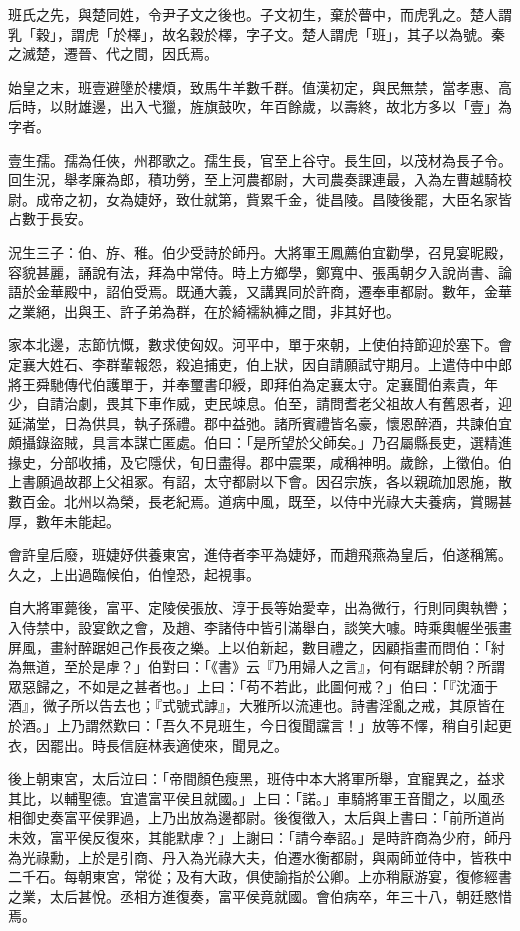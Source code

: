 
\begin{pinyinscope}
班氏之先，與楚同姓，令尹子文之後也。子文初生，棄於瞢中，而虎乳之。楚人謂乳「穀」，謂虎「於檡」，故名穀於檡，字子文。楚人謂虎「班」，其子以為號。秦之滅楚，遷晉、代之間，因氏焉。

始皇之末，班壹避墬於樓煩，致馬牛羊數千群。值漢初定，與民無禁，當孝惠、高后時，以財雄邊，出入弋獵，旌旗鼓吹，年百餘歲，以壽終，故北方多以「壹」為字者。

壹生孺。孺為任俠，州郡歌之。孺生長，官至上谷守。長生回，以茂材為長子令。回生況，舉孝廉為郎，積功勞，至上河農都尉，大司農奏課連最，入為左曹越騎校尉。成帝之初，女為婕妤，致仕就第，貲累千金，徙昌陵。昌陵後罷，大臣名家皆占數于長安。

況生三子：伯、斿、稚。伯少受詩於師丹。大將軍王鳳薦伯宜勸學，召見宴昵殿，容貌甚麗，誦說有法，拜為中常侍。時上方鄉學，鄭寬中、張禹朝夕入說尚書、論語於金華殿中，詔伯受焉。既通大義，又講異同於許商，遷奉車都尉。數年，金華之業絕，出與王、許子弟為群，在於綺襦紈褲之間，非其好也。

家本北邊，志節忼慨，數求使匈奴。河平中，單于來朝，上使伯持節迎於塞下。會定襄大姓石、李群輩報怨，殺追捕吏，伯上狀，因自請願試守期月。上遣侍中中郎將王舜馳傳代伯護單于，并奉璽書印綬，即拜伯為定襄太守。定襄聞伯素貴，年少，自請治劇，畏其下車作威，吏民竦息。伯至，請問耆老父祖故人有舊恩者，迎延滿堂，日為供具，執子孫禮。郡中益弛。諸所賓禮皆名豪，懷恩醉酒，共諫伯宜頗攝錄盜賊，具言本謀亡匿處。伯曰：「是所望於父師矣。」乃召屬縣長吏，選精進掾史，分部收捕，及它隱伏，旬日盡得。郡中震栗，咸稱神明。歲餘，上徵伯。伯上書願過故郡上父祖冢。有詔，太守都尉以下會。因召宗族，各以親疏加恩施，散數百金。北州以為榮，長老紀焉。道病中風，既至，以侍中光祿大夫養病，賞賜甚厚，數年未能起。

會許皇后廢，班婕妤供養東宮，進侍者李平為婕妤，而趙飛燕為皇后，伯遂稱篤。久之，上出過臨候伯，伯惶恐，起視事。

自大將軍薨後，富平、定陵侯張放、淳于長等始愛幸，出為微行，行則同輿執轡；入侍禁中，設宴飲之會，及趙、李諸侍中皆引滿舉白，談笑大噱。時乘輿幄坐張畫屏風，畫紂醉踞妲己作長夜之樂。上以伯新起，數目禮之，因顧指畫而問伯：「紂為無道，至於是虖？」伯對曰：「《書》云『乃用婦人之言』，何有踞肆於朝？所謂眾惡歸之，不如是之甚者也。」上曰：「苟不若此，此圖何戒？」伯曰：「『沈湎于酒』，微子所以告去也；『式號式謼』，大雅所以流連也。詩書淫亂之戒，其原皆在於酒。」上乃謂然歎曰：「吾久不見班生，今日復聞讜言！」放等不懌，稍自引起更衣，因罷出。時長信庭林表適使來，聞見之。

後上朝東宮，太后泣曰：「帝間顏色瘦黑，班侍中本大將軍所舉，宜寵異之，益求其比，以輔聖德。宜遣富平侯且就國。」上曰：「諾。」車騎將軍王音聞之，以風丞相御史奏富平侯罪過，上乃出放為邊都尉。後復徵入，太后與上書曰：「前所道尚未效，富平侯反復來，其能默虖？」上謝曰：「請今奉詔。」是時許商為少府，師丹為光祿勳，上於是引商、丹入為光祿大夫，伯遷水衡都尉，與兩師並侍中，皆秩中二千石。每朝東宮，常從；及有大政，俱使諭指於公卿。上亦稍厭游宴，復修經書之業，太后甚悅。丞相方進復奏，富平侯竟就國。會伯病卒，年三十八，朝廷愍惜焉。


\end{pinyinscope}
